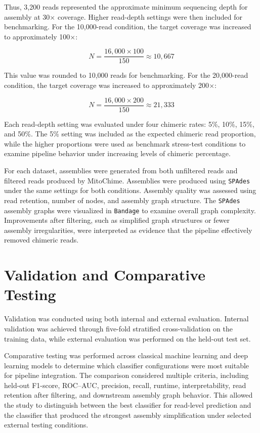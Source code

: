 Thus, 3{,}200 reads represented the approximate minimum sequencing depth for assembly at 30\(\times\) coverage. Higher read-depth settings were then included for benchmarking. For the 10{,}000-read condition, the target coverage was increased to approximately 100\(\times\):

\[
N = \frac{16{,}000 \times 100}{150} \approx 10{,}667
\]

This value was rounded to 10{,}000 reads for benchmarking. For the 20{,}000-read condition, the target coverage was increased to approximately 200\(\times\):

\[
N = \frac{16{,}000 \times 200}{150} \approx 21{,}333
\]

Each read-depth setting was evaluated under four chimeric rates: 5\%, 10\%, 15\%, and 50\%. The 5\% setting was included as the expected chimeric read proportion, while the higher proportions were used as benchmark stress-test conditions to examine pipeline behavior under increasing levels of chimeric percentage.

For each dataset, assemblies were generated from both unfiltered reads and filtered reads produced by MitoChime. Assemblies were produced using \texttt{SPAdes} under the same settings for both conditions. Assembly quality was assessed using read retention, number of nodes, and assembly graph structure. The \texttt{SPAdes} assembly graphs were visualized in \texttt{Bandage} to examine overall graph complexity. Improvements after filtering, such as simplified graph structures or fewer assembly irregularities, were interpreted as evidence that the pipeline effectively removed chimeric reads.

\section{Validation and Comparative Testing}

Validation was conducted using both internal and external evaluation. Internal validation was achieved through five-fold stratified cross-validation on the training data, while external evaluation was performed on the held-out test set.

Comparative testing was performed across classical machine learning and deep learning models to determine which classifier configurations were most suitable for pipeline integration. The comparison considered multiple criteria, including held-out F1-score, ROC--AUC, precision, recall, runtime, interpretability, read retention after filtering, and downstream assembly graph behavior. This allowed the study to distinguish between the best classifier for read-level prediction and the classifier that produced the strongest assembly simplification under selected external testing conditions.

